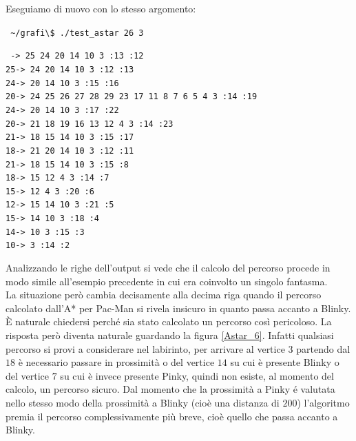 \documentclass[8pt]{book}
\begin{document}
Eseguiamo di nuovo con lo stesso argomento:

\texttt{
  \newline
  \textasciitilde{}/grafi\textbackslash{}\$ ./test\_astar 26 3
}

\texttt{
  -\textgreater{} 25 24 20 14 10 3 :13 :12\\
  25-\textgreater{} 24 20 14 10 3 :12 :13\\
  24-\textgreater{} 20 14 10 3 :15 :16\\
  20-\textgreater{} 24 25 26 27 28 29 23 17 11 8 7 6 5 4 3 :14 :19\\
  24-\textgreater{} 20 14 10 3 :17 :22\\
  20-\textgreater{} 21 18 19 16 13 12 4 3 :14 :23\\
  21-\textgreater{} 18 15 14 10 3 :15 :17\\
  18-\textgreater{} 21 20 14 10 3 :12 :11\\
  21-\textgreater{} 18 15 14 10 3 :15 :8\\
  18-\textgreater{} 15 12 4 3 :14 :7\\
  15-\textgreater{} 12 4 3 :20 :6\\
  12-\textgreater{} 15 14 10 3 :21 :5\\
  15-\textgreater{} 14 10 3 :18 :4\\
  14-\textgreater{} 10 3 :15 :3\\
  10-\textgreater{} 3 :14 :2\\
}
    

Analizzando le righe dell'output si vede che il calcolo del percorso procede in modo simile all'esempio precedente in cui era coinvolto un singolo fantasma.\\
La situazione però cambia decisamente alla decima riga quando il percorso calcolato dall'A* per Pac-Man si rivela insicuro in quanto passa accanto a Blinky. È naturale chiedersi perché sia stato calcolato un percorso così pericoloso. La risposta però diventa naturale guardando la figura \ref{Astar_6}. Infatti qualsiasi percorso si provi a considerare nel labirinto, per arrivare al vertice $3$ partendo dal $18$ è necessario passare in prossimità o del vertice $14$ su cui è presente Blinky o del vertice $7$ su cui è invece presente Pinky, quindi non esiste, al momento del calcolo, un percorso sicuro. Dal momento che la prossimità a Pinky é valutata nello stesso modo della prossimità a Blinky (cioè una distanza di $200$) l'algoritmo premia il percorso complessivamente più breve, cioè quello che passa accanto a Blinky.
\end{document}
